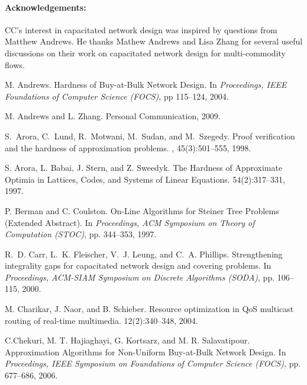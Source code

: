 \documentclass[11pt]{article}
\newcounter{thm0Rcopies}
\newcounter{thm_saved}
\begin{document}
\paragraph{Acknowledgements:} CC's interest in capacitated network
design was inspired by questions from Matthew Andrews. He thanks
Mathew Andrews and Lisa Zhang for several useful discussions
on their work on capacitated network design for multi-commodity
flows.

\begin{thebibliography}{10}
 M. Andrews.  \newblock Hardness of Buy-at-Bulk Network
  Design.  \newblock In {\em Proceedings, IEEE Foundations of Computer
    Science (FOCS)}, pp 115--124, 2004.

 M. Andrews and L. Zhang. Personal Communication, 2009.

S.~Arora, C.~Lund, R.~Motwani, M.~Sudan, and M.~Szegedy.
\newblock Proof verification and the hardness of approximation problems.
, 45(3):501--555, 1998.

S. Arora, L. Babai, J. Stern, and Z. Sweedyk.
\newblock The Hardness of Approximate Optimia in Lattices, Codes, and Systems of Linear Equations.
 54(2):317--331, 1997.



P. Berman and C. Coulston.
\newblock On-Line Algorithms for Steiner Tree Problems (Extended Abstract). 
\newblock In {\em Proceedings, ACM Symposium on Theory of Computation (STOC)}, pp. 344--353, 1997.

R.~D. Carr, L.~K. Fleischer, V.~J. Leung, and C.~A. Phillips.
\newblock Strengthening integrality gaps for capacitated network design and
  covering problems.
\newblock In {\em Proceedings, ACM-SIAM Symposium on Discrete Algorithms (SODA)},
  pp. 106--115, 2000.



M. Charikar, J. Naor, and B. Schieber.
\newblock Resource optimization in QoS multicast routing of real-time multimedia.
12(2):340--348, 2004.



C.Chekuri, M. T. Hajiaghayi, G. Kortsarz, and M. R. Salavatipour.
\newblock Approximation Algorithms for Non-Uniform Buy-at-Bulk Network Design.
\newblock In {\em Proceedings, IEEE Symposium on Foundations of Computer Science (FOCS)}, pp. 677--686, 2006.


\end{thebibliography}
\end{document}
